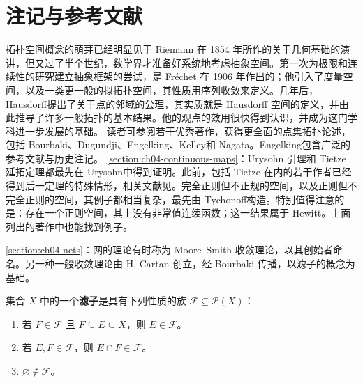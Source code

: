 \documentclass[../../main.tex]{subfiles}
\begin{document}
\section{注记与参考文献}\label{section:ch04-notes-references}
拓扑空间概念的萌芽已经明显见于 Riemann 在 1854 年所作的关于几何基础的演讲\cite{folland-bib-113}，但又过了半个世纪，数学界才准备好系统地考虑抽象空间。第一次为极限和连续性的研究建立抽象框架的尝试，是 Fréchet 在 1906 年作出的\cite{folland-bib-052}；他引入了度量空间，以及一类更一般的拟拓扑空间，其性质用序列收敛来定义。几年后，Hausdorff\cite{folland-bib-068}提出了关于点的邻域的公理，其实质就是 Hausdorff 空间的定义，并由此推导了许多一般拓扑的基本结果。他的观点的效用很快得到认识，并成为这门学科进一步发展的基础。
读者可参阅若干优秀著作，获得更全面的点集拓扑论述，包括 Bourbaki\cite{folland-bib-020}、Dugundji\cite{folland-bib-034}、Engelking\cite{folland-bib-038}、Kelley\cite{folland-bib-083}和 Nagata\cite{folland-bib-102}。Engelking\cite{folland-bib-038}包含广泛的参考文献与历史注记。
\cref{section:ch04-continuous-maps}：Urysohn 引理和 Tietze 延拓定理都最先在 Urysohn\cite{folland-bib-152}中得到证明。此前，包括 Tietze 在内的若干作者已经得到后一定理的特殊情形，相关文献见\cite{folland-bib-152}。完全正则但不正规的空间，以及正则但不完全正则的空间，其例子都相当复杂，最先由 Tychonoff\cite{folland-bib-151}构造。特别值得注意的是：存在一个正则空间，其上没有非常值连续函数；这一结果属于 Hewitt\cite{folland-bib-073}。上面列出的著作中也能找到例子。

\cref{section:ch04-nets}：网的理论有时称为 Moore--Smith 收敛理论，以其创始者命名\cite{folland-bib-101}。另一种一般收敛理论由 H. Cartan 创立，经 Bourbaki 传播，以滤子的概念为基础。
\begin{definition}[滤子]\label{definition:ch04-filter}
集合 $X$ 中的一个\textbf{滤子}是具有下列性质的族 $\mathcal F\subseteq\mathcal P(X)$：
\begin{enumerate}
\item\label{item:ch04-filter-upward} 若 $F\in\mathcal F$ 且 $F\subseteq E\subseteq X$，则 $E\in\mathcal F$。
\item\label{item:ch04-filter-intersection} 若 $E,F\in\mathcal F$，则 $E\cap F\in\mathcal F$。
\item\label{item:ch04-filter-proper} $\varnothing\notin\mathcal F$。
\end{enumerate}
\end{definition}
\end{document}

